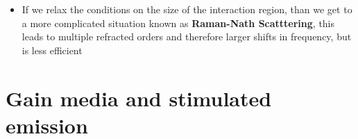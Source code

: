 \documentclass[english]{article}
\begin{document}
\begin{itemize}
\begin{enumerate}
\item If we want scattering to happen the angle $\theta$ between the light and sound and the sound frequency $\Omega$ cannot be chosen independently, if the sound travels at $v$ and the light at $\frac{c}{n}$, than for scattering to happen, we must have $\Omega= 2n\omega \frac{v}{c}\sin\left(\frac{\theta}{2}\right)$ (eq.~8.3.43 in Boyd)
\item  Since typically $v\ll c$ and all other factors are typically of order around $1$, we will  have $\Omega\ll \omega$, which allows for a lot of simplifications in the analysis, and also means that devices can still have reasonable efficiency when matching conditions are not exactly met: this allows tuning to be be done without having to rotate the material the wave travels through, Boyd does a full analysis in chapter 8.4 but I don't think that is useful here
\item Allowing for inexact matching means that an AOM can also be used as a controllable beam deflector, but with lower power the larger the mismatch is
\end{enumerate}
\item If we relax the conditions on the size of the interaction region, than we get to a more complicated situation known as \textbf{Raman-Nath Scatttering}, this leads to multiple refracted orders and therefore larger shifts in frequency, but is less efficient
\end{itemize}

\section{Gain media and stimulated emission}
\end{document}
